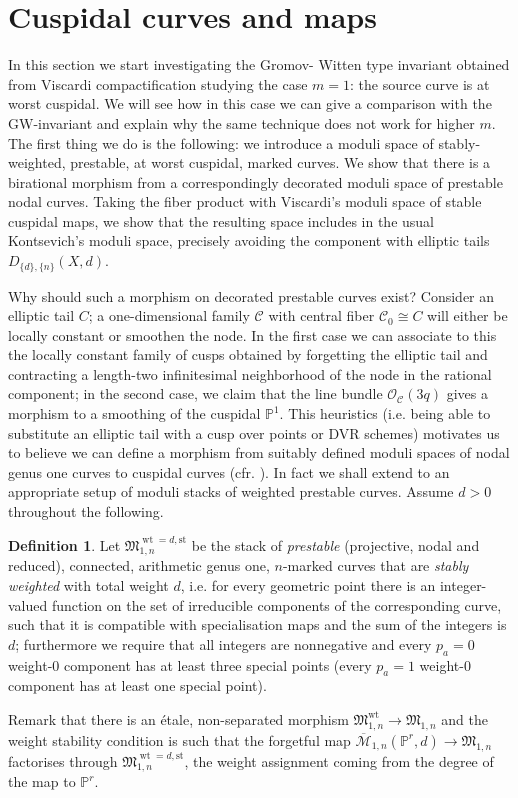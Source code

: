 \documentclass[11pt]{amsart}
\newcommand{\M}[4]{\overline{\mathcal M}_{#1,#2}(#3,#4)}
\newcommand{\PP}{\mathbb P}
\renewcommand{\to}{\rightarrow}
\theoremstyle{plain}
\theoremstyle{definition}
\newtheorem{dfn}[thm]{Definition}
\begin{document}
\section{Cuspidal curves and maps}

In this section we start investigating the Gromov- Witten type invariant obtained from Viscardi compactification studying the case $m=1$: the source curve is at worst cuspidal. We will see how in this case we can give a comparison with the GW-invariant and explain why the same technique does not work for higher $m$.
The first thing we do is the following:
we introduce a moduli space of stably-weighted, prestable, at worst cuspidal, marked curves. We show that there is a birational morphism from a correspondingly decorated moduli space of prestable nodal curves. Taking the fiber product with Viscardi's moduli space of stable cuspidal maps, we show that the resulting space includes in the usual Kontsevich's moduli space, precisely avoiding the component with elliptic tails $D_{\{d\},\{n\}}(X,d)$.

Why should such a morphism on decorated prestable curves exist? 
Consider an elliptic tail $C$; a one-dimensional family $\mathcal C$  with central fiber $\mathcal C_0\cong C$ will either be locally constant or smoothen the node. In the first case we can associate to this the locally constant family of cusps obtained by forgetting the elliptic tail and contracting a length-two infinitesimal neighborhood of the node in the rational component; in the second case, we claim that the line bundle $\mathcal O_\mathcal C(3q)$ gives a morphism to a smoothing of the cuspidal $\PP^1$. This heuristics (i.e. being able to substitute an elliptic tail with a cusp over points or DVR schemes) motivates us to believe we can define a morphism from suitably defined moduli spaces of nodal genus one curves to cuspidal curves (cfr. \cite[Lemma 4.2]{SMY2}). In fact we shall extend \cite[Corollary 4.5]{SMY2} to an appropriate setup of moduli stacks of weighted prestable curves. Assume $d>0$ throughout the following.

\begin{dfn}
Let $\mathfrak M_{1,n}^{\operatorname{wt}=d,\text{st}}$ be the stack of \emph{prestable} (projective, nodal and reduced), connected, arithmetic genus one, $n$-marked curves that are \emph{stably weighted} with total weight $d$, i.e. for every geometric point there is an integer-valued function on the set of irreducible components of the corresponding curve, such that it is compatible with specialisation maps and the sum of the integers is $d$; furthermore we require that all integers are nonnegative and every $p_a=0$ weight-0 component has at least three special points (every $p_a=1$ weight-0 component has at least one special point).
\end{dfn}
Remark that there is an \'{e}tale, non-separated morphism $\mathfrak M_{1,n}^{\operatorname{wt}}\to\mathfrak M_{1,n}$ and the weight stability condition is such that the forgetful map $\M{1}{n}{\PP^r}{d}\to\mathfrak M_{1,n}$ factorises through $\mathfrak M_{1,n}^{\operatorname{wt}=d,\text{st}}$, the weight assignment coming from the degree of the map to $\PP^r$.
\end{document}
